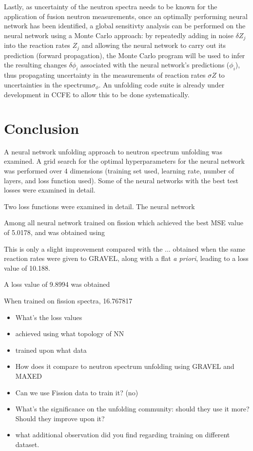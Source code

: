 \documentclass[a4paper, 12pt]{article}
\begin{document}
Lastly, as uncertainty of the neutron spectra needs to be known for the application of fusion neutron measurements, once an optimally performing neural network has been identified, a global sensitivty analysis can be performed on the neural network using a Monte Carlo approach: by repeatedly adding in noise $\delta Z_j$ into the reaction rates $Z_j$ and allowing the neural network to carry out its prediction (forward propagation), the Monte Carlo program will be used to infer the resulting changes $\delta \phi_i$ associated with the neural network's predictions ($\phi_i$), thus propagating uncertainty in the measurements of reaction rates $\sigma{Z}$ to uncertainties in the spectrum$\sigma_{\phi}$. An unfolding code suite is already under development in CCFE to allow this to be done systematically.

\section{Conclusion}
A neural network unfolding approach to neutron spectrum unfolding was examined. A grid search for the optimal hyperparameters for the neural network was performed over 4 dimensions (training set used, learning rate, number of layers, and loss function used). Some of the neural networks with the best test losses were examined in detail.

Two loss functions were examined in detail. The neural network

Among all neural network trained on fission which achieved the best MSE value of 5.0178, and was obtained using %

This is only a slight improvement compared with the ... obtained when the same reaction rates were given to GRAVEL, along with a flat \emph{a priori}, leading to a loss value of 10.188.

A loss value of 9.8994 was obtained 

When trained on fission spectra, 16.767817 %

\begin{itemize}
    \item What's the loss values
    \item achieved using what topology of NN
    \item trained upon what data
    \item How does it compare to neutron spectrum unfolding using GRAVEL and MAXED
    \item Can we use Fission data to train it? (no)
    \item What's the significance on the unfolding community: should they use it more? Should they improve upon it?
    \item what additional observation did you find regarding training on different dataset.
\end{itemize}
\end{document}
